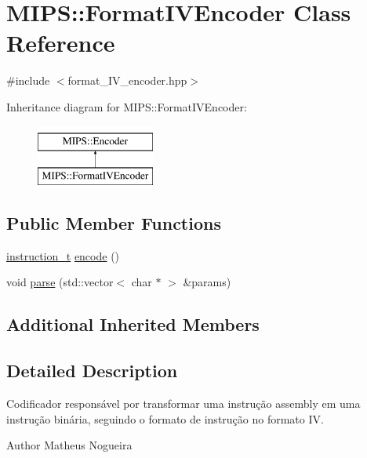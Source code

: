 \hypertarget{classMIPS_1_1FormatIVEncoder}{}\section{M\+I\+PS\+:\+:Format\+I\+V\+Encoder Class Reference}
\label{classMIPS_1_1FormatIVEncoder}


{\ttfamily \#include $<$format\+\_\+\+I\+V\+\_\+encoder.\+hpp$>$}

Inheritance diagram for M\+I\+PS\+:\+:Format\+I\+V\+Encoder\+:\begin{figure}[H]
\begin{center}
\leavevmode
\includegraphics[height=2.000000cm]{classMIPS_1_1FormatIVEncoder}
\end{center}
\end{figure}
\subsection*{Public Member Functions}
\begin{DoxyCompactItemize}
\item 
\hyperlink{core_8hpp_aa514fd240a0e29abb2a2e4c805d7f1a4}{instruction\+\_\+t} \hyperlink{classMIPS_1_1FormatIVEncoder_a1d23ca4c9c81536dd43a18dc8dd43f97}{encode} ()
\item 
void \hyperlink{classMIPS_1_1FormatIVEncoder_a42f251011a97af63a707b4d0607e18a9}{parse} (std\+::vector$<$ char $\ast$ $>$ \&params)
\end{DoxyCompactItemize}
\subsection*{Additional Inherited Members}


\subsection{Detailed Description}
Codificador responsável por transformar uma instrução assembly em uma instrução binária, seguindo o formato de instrução no formato IV.

\begin{DoxyAuthor}{Author}
Matheus Nogueira 
\end{DoxyAuthor}


